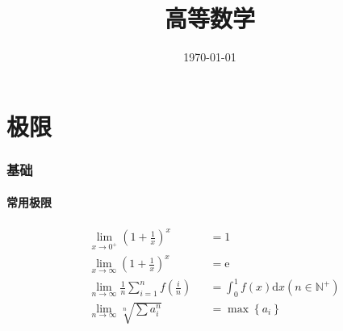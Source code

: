 \documentclass{article}
\title{高等数学}
\author{}
\date{\today}
\begin{document}
\hypersetup{
    hidelinks,
    allcolors = black,
    breaklinks = true
}

\newtheorem{definition}{Definition}[subsection]
\newtheorem{theorem}{Theorem}[subsection]
\newtheorem{corollary}{Corollary}[theorem]
\renewcommand{\proofname}{\indent\bf Proof}
\renewcommand{\Re}{\operatorname{Re}}
\renewcommand{\Im}{\operatorname{Im}}

\def\e{\mathrm e}
\def\i{\mathrm i}
\def\d{\mathrm d}
\def\C{\mathrm C}
\def\sr{\mathbb R}
\def\sn{\mathbb N}
\def\snp{\mathbb N^+}
\def\sc{\mathbb C}
\def\sz{\mathbb Z}
\def\sech{\mathrm{sech}}
\def\csch{\mathrm{csch}}

\newcommand{\abs}[1]{\left|#1\right|}
\newcommand{\p}[1]{\left(#1\right)}
\newcommand{\jacobi}[2]{\frac{\partial\p{#1}}{\partial\p{#2}}}

\begin{titlepage}
    \maketitle
\end{titlepage}

\tableofcontents
\newpage

\part{极限}

\section{基础}

\subsection{常用极限}

\[\begin{aligned}
         & \lim_{x\to0^+}{\p{1+\frac1x}^x}                     &  & =1                              \\
         & \lim_{x\to\infty}{\p{1+\frac1x}^x}                  &  & =\e                             \\
         & \lim_{n\to\infty}{\frac1n\sum_{i=1}^nf\p{\frac in}} &  & =\int_0^1f\p{x}\d x\p{n\in\snp} \\
         & \lim_{n\to\infty}{\sqrt[n]{\sum a_i^n}}             &  & =\max{\left\{a_i\right\}}
    \end{aligned}\]
\end{document}
